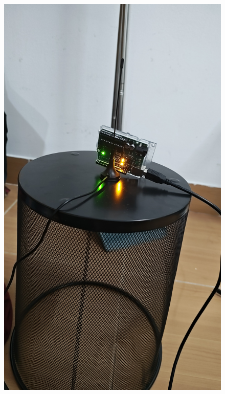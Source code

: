 \documentclass{article}
\begin{document}
\begin{figure}[h]
\includegraphics[width=\textwidth]{setup.jpeg}
\end{figure}
\end{document}
